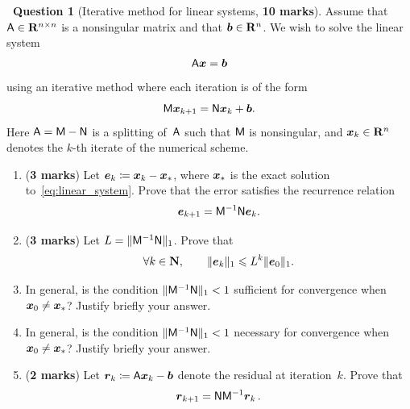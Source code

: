 \documentclass[10pt]{article}
\theoremstyle{definition}
\newtheorem{question}{{\normalfont \faGears}~Question}
\renewcommand{\mymarks}[1]{\textbf{#1 marks}}
\begin{document}
\newpage
\begin{question}
    [Iterative method for linear systems, \textbf{10 marks}]
    Assume that $\mathsf A \in \mathbf R^{n \times n}$ is a nonsingular matrix and that $\mathbf{\boldsymbol{b}} \in \mathbf R^n$.
    We wish to solve the linear system
    \begin{equation}
        \label{eq:linear_system}
        \mathsf A \mathbf{\boldsymbol{x}} = \mathbf{\boldsymbol{b}}
    \end{equation}
    using an iterative method where each iteration is of the form
    \begin{equation}
        \label{eq:iterative_scheme}
        \mathsf M \mathbf{\boldsymbol{x}}_{k+1} = \mathsf N \mathbf{\boldsymbol{x}}_k + \mathbf{\boldsymbol{b}}.
    \end{equation}
    Here $\mathsf A = \mathsf M - \mathsf N$ is a splitting of~$\mathsf A$ such that $\mathsf M$ is nonsingular,
    and $\mathbf{\boldsymbol{x}}_k \in \mathbf R^n$ denotes the $k$-th iterate of the numerical scheme.

    \begin{enumerate}
        \item
            (\mymarks{3})
            Let $\mathbf{\boldsymbol{e}}_k \coloneq \mathbf{\boldsymbol{x}}_k - \mathbf{\boldsymbol{x}}_*$,
            where $\mathbf{\boldsymbol{x}}_*$ is the exact solution to~\eqref{eq:linear_system}.
            Prove that the error satisfies the recurrence relation
            \[
                \mathbf{\boldsymbol{e}}_{k+1} = \mathsf M^{-1} \mathsf N \mathbf{\boldsymbol{e}}_k.
            \]
            \vspace{5cm}

        \item
            (\mymarks{3})
            Let $L = \lVert\mathsf M^{-1} \mathsf N\rVert_{1}$.
            Prove that
            \begin{equation}
                \label{eq:inequality_interpolation}
                \forall k \in \mathbf N, \qquad
                \lVert\mathbf{\boldsymbol{e}}_k\rVert_{1} \leqslant L^k \lVert\mathbf{\boldsymbol{e}}_0\rVert_{1}.
            \end{equation}
            \vspace{6cm}

        \item
            \mymark
            In general, is the condition $\lVert\mathsf M^{-1} \mathsf N\rVert_{1} < 1$ sufficient
            for convergence when $\mathbf{\boldsymbol{x}}_0 \neq \mathbf{\boldsymbol{x}}_*$?
            Justify briefly your answer.
            \vspace{3cm}

        \item
            \mymark
            In general, is the condition $\lVert\mathsf M^{-1} \mathsf N\rVert_{1} < 1$ necessary
            for convergence when $\mathbf{\boldsymbol{x}}_0 \neq \mathbf{\boldsymbol{x}}_*$?
            Justify briefly your answer.
            \vspace{3cm}

        \item
            (\textbf{2 marks})
            Let $\mathbf{\boldsymbol{r}}_k \coloneq \mathsf A \mathbf{\boldsymbol{x}}_k - \mathbf{\boldsymbol{b}}$ denote the residual at iteration~$k$.
            Prove that
            \[
                \mathbf{\boldsymbol{r}}_{k+1} = \mathsf N \mathsf M^{-1} \mathbf{\boldsymbol{r}}_k \, .
            \]
    \end{enumerate}
\end{question}
\end{document}

